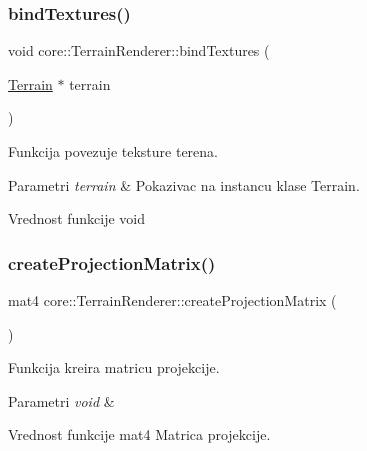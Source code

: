 \subsubsection{\texorpdfstring{bind\+Textures()}{bindTextures()}}
{\footnotesize\ttfamily void core\+::\+Terrain\+Renderer\+::bind\+Textures (\begin{DoxyParamCaption}\item[{\hyperlink{classterrain_1_1Terrain}{Terrain} $\ast$}]{terrain }\end{DoxyParamCaption})}



Funkcija povezuje teksture terena. 


\begin{DoxyParams}{Parametri}
{\em terrain} & Pokazivac na instancu klase Terrain. \\
\hline
\end{DoxyParams}
\begin{DoxyReturn}{Vrednost funkcije}
void 
\end{DoxyReturn}
\mbox{\label{classcore_1_1TerrainRenderer_a06f89d76316964a8da14498ec43756f0}} 
\subsubsection{\texorpdfstring{create\+Projection\+Matrix()}{createProjectionMatrix()}}
{\footnotesize\ttfamily mat4 core\+::\+Terrain\+Renderer\+::create\+Projection\+Matrix (\begin{DoxyParamCaption}{ }\end{DoxyParamCaption})\hspace{0.3cm}{\ttfamily [private]}}



Funkcija kreira matricu projekcije. 


\begin{DoxyParams}{Parametri}
{\em void} & \\
\hline
\end{DoxyParams}
\begin{DoxyReturn}{Vrednost funkcije}
mat4 Matrica projekcije. 
\end{DoxyReturn}
\mbox{\label{classcore_1_1TerrainRenderer_aa81fb29d5ab446955ffc1aae79514d8a}} 
